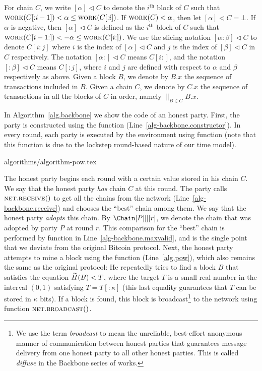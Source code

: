 \noindent
{}
For chain $C$, we write $[\alpha] \lhd C$
to denote the $i^\text{th}$ block of $C$ such that
$\textsc{work}(C[{:}{i - 1}]) < \alpha \leq \textsc{work}(C[{:}{i}])$.
If $\textsc{work}(C) < \alpha$, then let $[\alpha] \lhd C = \bot$.
If $\alpha$ is negative, then $[\alpha] \lhd C$ is defined as
the $i^\text{th}$ block of $C$ such that
$\textsc{work}(C[{i - 1}{:}]) < -\alpha \leq \textsc{work}(C[{i}{:}])$.
We use the slicing notation $[{\alpha}{:}{\beta}] \lhd C$ to denote
$C[{i}{:}{j}]$ where $i$ is the index of $[\alpha] \lhd C$
and $j$ is the index of $[\beta] \lhd C$ in $C$ respectively.
The notation $[{\alpha}{:}] \lhd C$ means $C[{i}{:}]$,
and the notation $[{:}\beta] \lhd C$ means $C[{:}{j}]$,
where $i$ and $j$ are defined with respect to $\alpha$ and $\beta$
respectively as above.
Given a block $B$, we denote by $B.x$ the sequence of transactions
included in $B$.
Given a chain $C$, we denote by $C.x$
the sequence of transactions in all the blocks of $C$ in order, namely
${\big\lVert}_{B \in C} B.x$.

In Algorithm~\ref{alg.backbone} we show the code of an honest party.
First, the party is constructed using the \constructor function (Line~\ref{alg-backbone.constructor}).
In every round, each party is executed by the environment using function \execute
(note that this function is due to the lockstep round-based nature of
our time model).

{algorithms/algorithm-pow.tex}

The honest party begins each round with a certain value stored in his chain $C$.
We say that the honest party \emph{has} chain $C$ at this round. The party calls $\textsc{net}.\textsc{re}\-\textsc{ceive}()$ to get all
the chains from the network (Line~\ref{alg-backbone.receive}) and chooses the
``best'' chain among them. We say that the honest party
\emph{adopts} this chain. By $\Chain[P][][r]$, we denote the chain that was adopted
by party $P$ at round $r$.
This comparison for the ``best'' chain is performed by
function \maxvalid in Line~\ref{alg-backbone.maxvalid}, and
is the single point that we deviate from the original Bitcoin protocol.
Next, the honest party attempts to mine a block using the \pow function (Line~\ref{alg.pow}),
which also remains the same as the original protocol: He repeatedly tries to find a block $B$
that satisfies the \pow equation $\widetilde{H}(B) < T$, where the target $T$ is a small real number in
the interval $(0, 1)$ satisfying $T = T[{:}\kappa]$ (this last equality guarantees that $T$ can be stored in
$\kappa$ bits).
If a block is found, this block is broadcast\footnote{We use the term \emph{broadcast}
to mean the unreliable, best-effort anonymous manner of communication between honest parties that
guarantees message delivery from one honest party to all other honest parties.
This is called \emph{diffuse} in the Backbone series of works.}
to the network using function $\textsc{net}.\textsc{broadcast}()$.

